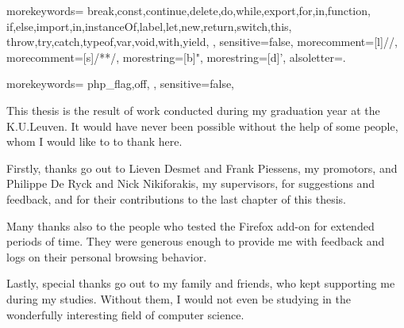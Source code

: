 \documentclass[master=cws,english]{kulemt}
\begin{document}
 {
    morekeywords={
        break,const,continue,delete,do,while,export,for,in,function,
        if,else,import,in,instanceOf,label,let,new,return,switch,this,
        throw,try,catch,typeof,var,void,with,yield,
        },
    sensitive=false,
    morecomment=[l]{//},
    morecomment=[s]{/*}{*/},
    morestring=[b]",
    morestring=[d]',
    alsoletter={.}
}

 {
    morekeywords={
        php_flag,off,
        },
    sensitive=false,
}


\begin{preface}
This thesis is the result of work conducted during my graduation year at the K.U.Leuven. It would have never been possible without the help of some people, whom I would like to to thank here.

Firstly, thanks go out to Lieven Desmet and Frank Piessens, my promotors, and Philippe De Ryck and Nick Nikiforakis, my supervisors, for suggestions and feedback, and for their contributions to the last chapter of this thesis.

Many thanks also to the people who tested the Firefox add-on for extended periods of time. They were generous enough to provide me with feedback and logs on their personal browsing behavior.

Lastly, special thanks go out to my family and friends, who kept supporting me during my studies. Without them, I would not even be studying in the wonderfully interesting field of computer science.
\end{preface}

\tableofcontents*
\end{document}
